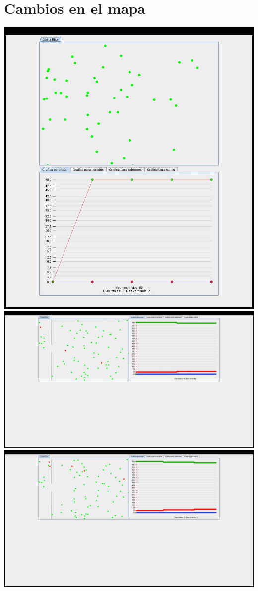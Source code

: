 \documentclass{report}
\begin{document}
\section{Cambios en el mapa}
\includegraphics[scale=0.20]{1}
\includegraphics[scale=0.20]{2}
\includegraphics[scale=0.20]{3}
\end{document}
